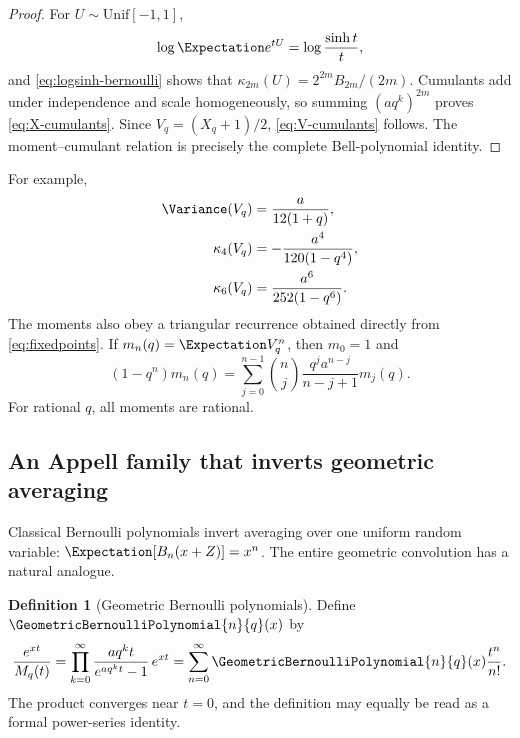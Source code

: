 \documentclass[11pt,oneside]{article}
\theoremstyle{definition}
\newtheorem{definition}[theorem]{Definition}
\theoremstyle{remark}
\begin{document}
\begin{proof}
For $U\sim\mathrm{Unif}[-1,1]$,
\[
 \log\Expectation e^{tU}=\log\frac{\sinh t}{t},
\]
and \eqref{eq:logsinh-bernoulli} shows that
$\kappa_{2m}(U)=2^{2m}B_{2m}/(2m)$.  Cumulants add under independence and scale
homogeneously, so summing $(aq^k)^{2m}$ proves \eqref{eq:X-cumulants}.
Since $V_q=(X_q+1)/2$, \eqref{eq:V-cumulants} follows.  The moment--cumulant relation
is precisely the complete Bell-polynomial identity.
\end{proof}

For example,
\begin{align}
 \Variance(V_q)&=\frac{a}{12(1+q)},\label{eq:Vvariance}\\
 \kappa_4(V_q)&=-\frac{a^4}{120(1-q^4)},\\
 \kappa_6(V_q)&=\frac{a^6}{252(1-q^6)}.
\end{align}
The moments also obey a triangular recurrence obtained directly from
\eqref{eq:fixedpoints}.  If $m_n(q)=\Expectation V_q^n$, then $m_0=1$ and
\begin{equation}
 (1-q^n)m_n(q)=
 \sum_{j=0}^{n-1}\binom nj
 \frac{q^j a^{n-j}}{n-j+1}m_j(q).
 \label{eq:moment-recurrence}
\end{equation}
For rational $q$, all moments are rational.

\subsection{An Appell family that inverts geometric averaging}

Classical Bernoulli polynomials invert averaging over one uniform random variable:
$\Expectation[B_n(x+Z)]=x^n$.  The entire geometric convolution has a natural analogue.

\begin{definition}[Geometric Bernoulli polynomials]
Define $\GeometricBernoulliPolynomial{n}{q}(x)$ by
\begin{equation}
 \frac{e^{xt}}{M_q(t)}
 =\prod_{k=0}^{\infty}\frac{aq^kt}{e^{aq^kt}-1}\,e^{xt}
 =\sum_{n=0}^{\infty}\GeometricBernoulliPolynomial{n}{q}(x)\frac{t^n}{n!}.
 \label{eq:geometric-Bernoulli-egf}
\end{equation}
The product converges near $t=0$, and the definition may equally be read as a formal
power-series identity.
\end{definition}
\end{document}
